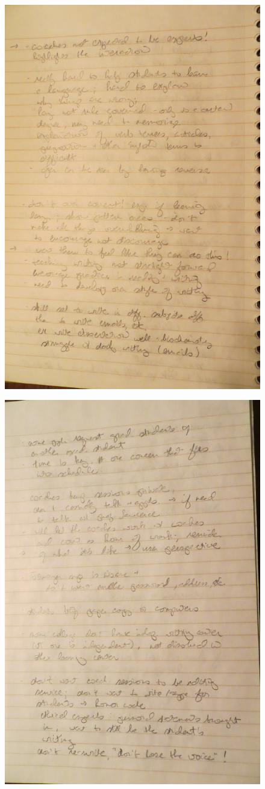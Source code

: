 \documentclass[12pt]{article} %
\begin{document}
  \begin{figure}[H]
  \centering
  \includegraphics[width=0.75\linewidth]{RAZ_raw_notes6}
  \caption{}
  \label{fig:rn6}
  \end{figure}
  \begin{figure}[H]
  \centering
  \includegraphics[width=0.75\linewidth]{RAZ_raw_notes7}
  \caption{}
  \label{fig:rn7}
  \end{figure}
\end{document}
